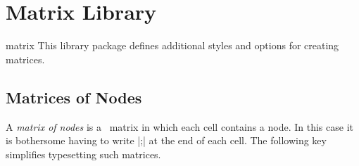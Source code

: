 %
%
%


\section{Matrix Library}

\begin{tikzlibrary}{matrix}
    This library package defines additional styles and options for creating
    matrices.
\end{tikzlibrary}


\subsection{Matrices of Nodes}

A \emph{matrix of nodes} is a \tikzname\ matrix in which each cell contains a
node. In this case it is bothersome having to write |;| at the end of each cell. The following key simplifies
typesetting such matrices.

